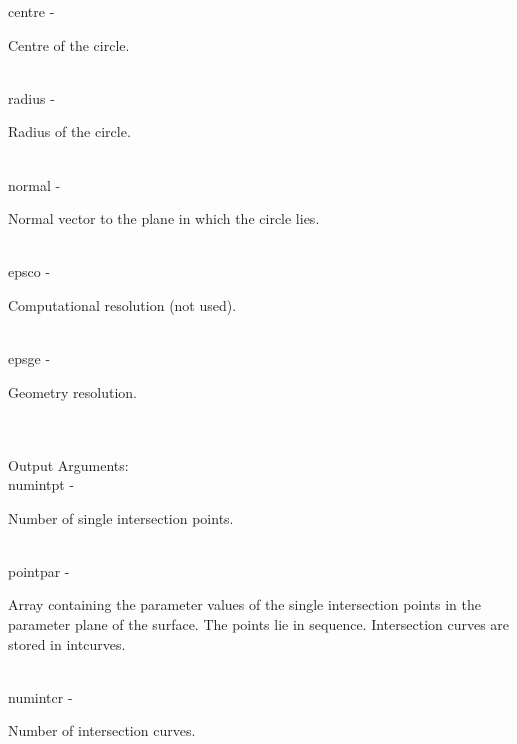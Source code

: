         \>\>    {\fov centre}\> - \>    \begin{minipg2}
                                Centre of the circle.
                                \end{minipg2}\\
        \>\>    {\fov radius}\> - \>    \begin{minipg2}
                                Radius of the circle.
                                \end{minipg2}\\
        \>\>    {\fov normal}\> - \>    \begin{minipg2}
                                Normal vector to the plane in which the circle
                                lies.
                                \end{minipg2}\\
        \>\>    {\fov epsco}\> - \>     \begin{minipg2}
                                Computational resolution (not used).
                                \end{minipg2}\\
        \>\>    {\fov epsge}\> - \>     \begin{minipg2}
                                Geometry resolution.
                                \end{minipg2}\\
\\
        \>Output Arguments:\\
        \>\>    {\fov numintpt}\> - \>\begin{minipg2}
                                Number of single intersection points.
                                \end{minipg2}\\
        \>\>    {\fov pointpar}\> - \>  \begin{minipg2}
                                Array containing the parameter values of the
                                single intersection points in the parameter plane
                                of the surface. The points lie in sequence.
                                Intersection curves are stored in intcurves.
                                \end{minipg2}\\[0.8ex]
        \>\>    {\fov numintcr}\> - \>  \begin{minipg2}
                                Number of intersection curves.
                                \end{minipg2}\\
